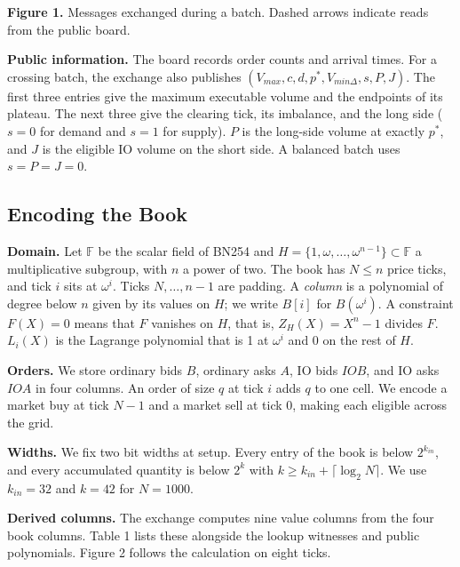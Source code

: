 \textbf{Figure 1.} Messages exchanged during a batch. Dashed arrows indicate reads from the public board.

\textbf{Public information.} The board records order counts and arrival times. For a crossing batch, the exchange also publishes \((V_{max},c,d,p^*,V_{min\Delta},s,P,J)\). The first three entries give the maximum executable volume and the endpoints of its plateau. The next three give the clearing tick, its imbalance, and the long side (\(s=0\) for demand and \(s=1\) for supply). \(P\) is the long-side volume at exactly \(p^*\), and \(J\) is the eligible IO volume on the short side. A balanced batch uses \(s=P=J=0\).

\subsection{Encoding the Book}

\textbf{Domain.} Let \(\mathbb{F}\) be the scalar field of BN254 and \(H = \{1, \omega, \ldots, \omega^{n-1}\} \subset \mathbb{F}\) a multiplicative subgroup, with \(n\) a power of two. The book has \(N \le n\) price ticks, and tick \(i\) sits at \(\omega^i\). Ticks \(N, \ldots, n-1\) are padding. A \emph{column} is a polynomial of degree below \(n\) given by its values on \(H\); we write \(B[i]\) for \(B(\omega^i)\). A constraint \(F(X) = 0\) means that \(F\) vanishes on \(H\), that is, \(Z_H(X) = X^n - 1\) divides \(F\). \(L_i(X)\) is the Lagrange polynomial that is 1 at \(\omega^i\) and 0 on the rest of \(H\).

\textbf{Orders.} We store ordinary bids \(B\), ordinary asks \(A\), IO bids \(IOB\), and IO asks \(IOA\) in four columns. An order of size \(q\) at tick \(i\) adds \(q\) to one cell. We encode a market buy at tick \(N-1\) and a market sell at tick 0, making each eligible across the grid.

\textbf{Widths.} We fix two bit widths at setup. Every entry of the book is below \(2^{k_{in}}\), and every accumulated quantity is below \(2^k\) with \(k \ge k_{in} + \lceil \log_2 N \rceil\). We use \(k_{in} = 32\) and \(k = 42\) for \(N = 1000\).

\textbf{Derived columns.} The exchange computes nine value columns from the four book columns. Table 1 lists these alongside the lookup witnesses and public polynomials. Figure 2 follows the calculation on eight ticks.

